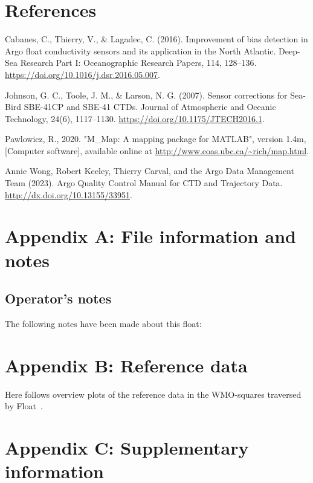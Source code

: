 \documentclass{article}
\begin{document}
\section*{References}
\begin{list}{}{}
\item Cabanes, C., Thierry, V., \& Lagadec, C. (2016). Improvement of bias
  detection in Argo float conductivity sensors and its application in the
  North Atlantic. Deep-Sea Research Part I: Oceanographic Research Papers,
  114, 128–136. \href{url}{https://doi.org/10.1016/j.dsr.2016.05.007}.
\item Johnson, G. C., Toole, J. M., \& Larson, N. G. (2007). Sensor
  corrections for Sea-Bird SBE-41CP and SBE-41 CTDs. Journal of
  Atmospheric and Oceanic Technology, 24(6), 1117–1130.
  \href{url}{https://doi.org/10.1175/JTECH2016.1}.
\item Pawlowicz, R., 2020. "M\_Map: A mapping package for MATLAB", version
  1.4m, [Computer software], available online at
  \url{http://www.eoas.ubc.ca/~rich/map.html}.
\item Annie Wong, Robert Keeley, Thierry Carval, and the Argo Data Management Team (2023).
  Argo Quality Control Manual for CTD and Trajectory Data. 
  \href{url}{http://dx.doi.org/10.13155/33951}.
\end{list}


\newpage
\FloatBarrier
\section{Appendix A: File information and notes}\label{sec:appendix-notes}
%
\subsection*{Operator's notes}
The following notes have been made about this float:



\FloatBarrier
\section{Appendix B: Reference data}\label{sec:appendix-refdata}
Here follows overview plots of the reference data in the WMO-squares
traversed by Float~\WMOnum.


\FloatBarrier
\section{Appendix C: Supplementary information}\label{sec:supplementary}


\end{document}
